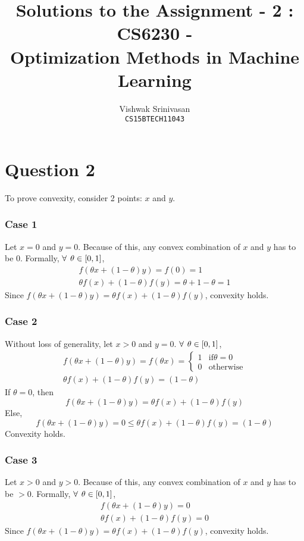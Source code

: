 \documentclass[10.5pt]{article}
\title{Solutions to the Assignment - 2 : CS6230 - \\
Optimization Methods in Machine Learning}
\author{Vishwak Srinivasan\\
\texttt{CS15BTECH11043}}
\date{}
\begin{document}
\maketitle

\section*{Question 2}
\begin{flushleft}
To prove convexity, consider 2 points: \(x\) and \(y\).
\subsubsection*{Case 1}
Let \(x = 0\) and \(y = 0\). Because of this, any convex combination of \(x\) and \(y\) has to be \(0\). Formally, \(\forall \hspace{1.5mm} \theta \in [0, 1]\),
\begin{gather*}
f(\theta x + (1 - \theta) y) = f(0) = 1 \\
\theta f(x) + (1 - \theta) f(y) = \theta + 1 - \theta = 1
\end{gather*}
Since \(f(\theta x + (1 - \theta) y) = \theta f(x) + (1 - \theta) f(y)\), convexity holds.

\subsubsection*{Case 2}
Without loss of generality, let \(x > 0\) and \(y = 0\). \(\forall \hspace{1.5mm} \theta \in [0, 1]\),
\begin{gather*}
f(\theta x + (1 - \theta)y) = f(\theta x) = \begin{cases} 1 & \text{if} \theta = 0 \\ 0 & \text{otherwise} \end{cases} \\
\theta f(x) + (1 - \theta) f(y) = (1 - \theta)
\end{gather*}
If \(\theta = 0\), then \[f(\theta x + (1 - \theta)y) = \theta f(x) + (1 - \theta) f(y)\] Else, \[f(\theta x + (1 - \theta)y) = 0 \leq \theta f(x) + (1 - \theta) f(y) = (1  - \theta)\] Convexity holds.

\subsubsection*{Case 3}
Let \(x > 0\) and \(y > 0\). Because of this, any convex combination of \(x\) and \(y\) has to be \(> 0\). Formally, \(\forall \hspace{1.5mm} \theta \in [0, 1]\),
\begin{gather*}
f(\theta x + (1 - \theta)y) = 0 \\
\theta f(x) + (1 - \theta) f(y) = 0
\end{gather*}
Since \(f(\theta x + (1 - \theta) y) = \theta f(x) + (1 - \theta) f(y)\), convexity holds.


\end{flushleft}
\end{document}
